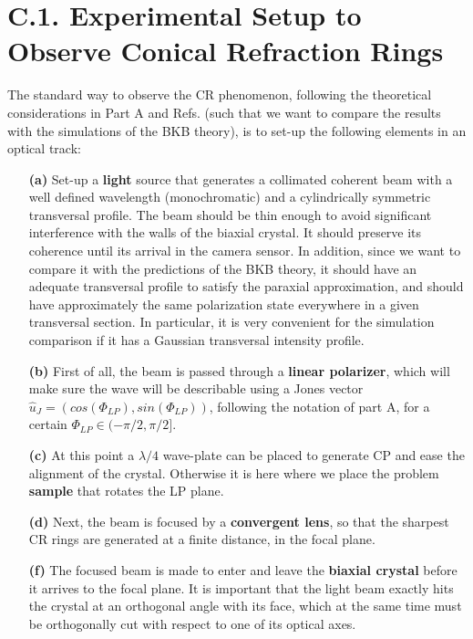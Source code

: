 \documentclass[11pt, a4paper, twoside]{article} %
\begin{document}
\section*{C.1. Experimental Setup to Observe Conical Refraction Rings}\vspace{-0.2cm}
The standard way to observe the CR phenomenon, following the theoretical considerations in Part A and Refs. \cite{Todor, Turpin} (such that we want to compare the results with the simulations of the BKB theory), is to set-up the following elements in an optical track:\vspace{-0.2cm} 
\begin{itemize}
\item[\bf (a)] Set-up a {\bf light} source that generates a collimated coherent beam with a well defined wavelength (monochromatic) and a cylindrically symmetric transversal profile. The beam should be thin enough to avoid significant interference with the walls of the biaxial crystal. It should preserve its coherence until its arrival in the camera sensor. In addition, since we want to compare it with the predictions of the BKB theory, it should have an adequate transversal profile to satisfy the paraxial approximation, and should have approximately the same polarization state everywhere in a given transversal section. In particular, it is very convenient for the simulation comparison if it has a Gaussian transversal intensity profile.

\item[\bf (b)] First of all, the beam is passed through a {\bf linear polarizer}, which will make sure the wave will be describable using a Jones vector $\hat{u}_J=(cos(\Phi_{LP}), sin(\Phi_{LP}))$, following the notation of part A, for a certain $\Phi_{LP}\in(-\pi/2, \pi/2]$.

\item[\bf (c)] At this point a $\lambda/4$ wave-plate can be placed to generate CP and ease the alignment of the
crystal. Otherwise it is here where we place the problem {\bf sample} that rotates the LP plane. 

\item[\bf (d)] Next, the beam is focused by a {\bf convergent lens}, so that the sharpest CR rings are generated at a finite distance, in the focal plane.

\item[\bf (f)] The focused beam is made to enter and leave the {\bf biaxial crystal} before it arrives to the focal plane. It is important that the light beam exactly hits the crystal at an orthogonal angle with its face, which at the same time must be orthogonally cut with respect to one of its optical axes. 


\end{itemize}
\end{document}
